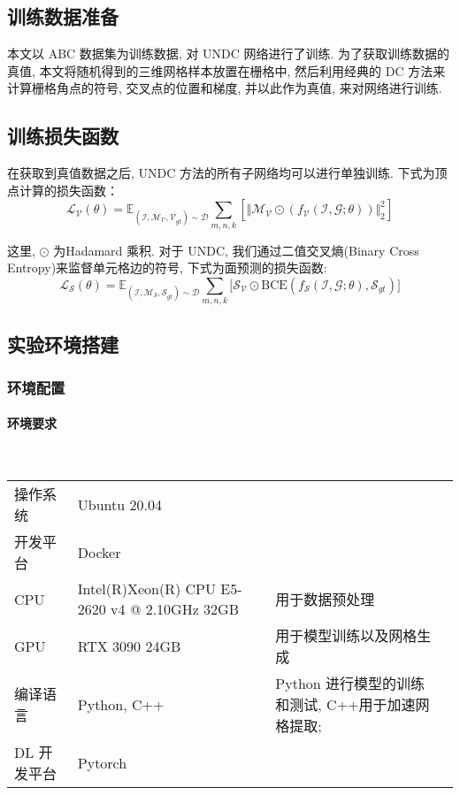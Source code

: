 \subsection{训练数据准备}
本文以 ABC 数据集为训练数据, 对 UNDC 网络进行了训练. 为了获取训练数据的真值, 本文将随机得到的三维网格样本放置在栅格中, 然后利用经典的 DC 方法来计算栅格角点的符号, 交叉点的位置和梯度, 并以此作为真值, 来对网络进行训练. 
\subsection{训练损失函数}
在获取到真值数据之后, UNDC 方法的所有子网络均可以进行单独训练. 下式为顶点计算的损失函数：
\begin{equation}
\mathcal{L_V}(\theta)=\mathbb{E}_{(\mathcal{I, M_V, V}_{gt})\sim \mathcal{D}}\sum _{m,n,k} [ \Vert \mathcal{M_V} \odot (f_{\mathcal{V}}(\mathcal{I,G};\theta)) \Vert ^2_2 ]
\end{equation}

这里, $\odot$ 为Hadamard 乘积. 对于 UNDC, 我们通过二值交叉熵(Binary Cross Entropy)来监督单元格边的符号, 下式为面预测的损失函数:
\begin{equation}
\mathcal{L_S}(\theta)=\mathbb{E}_{(\mathcal{I, M_S, S}_{gt})\sim \mathcal{D}}\sum_{m,n,k} \lbrack \mathcal{S_V} \odot \mathrm{BCE}(f_\mathcal{S}(\mathcal{I,G};\theta), \mathcal{S}_{gt}) \rbrack
\end{equation}

\subsection{实验环境搭建}
\subsubsection{环境配置}
\paragraph{环境要求}~{}

\begin{table}[h]
    \centering
    \begin{tabularx}{\textwidth}{X X X X}
		操作系统 & Ubuntu 20.04 & \\
		开发平台 & Docker & \\
		CPU & Intel(R)Xeon(R) CPU E5-2620 v4 @ 2.10GHz 32GB & 用于数据预处理 \\
		GPU & RTX 3090 24GB & 用于模型训练以及网格生成 \\
		编译语言 & Python, C++ & Python 进行模型的训练和测试, C++用于加速网格提取; \\
		DL 开发平台 & Pytorch & \\
    \end{tabularx}
\end{table}

